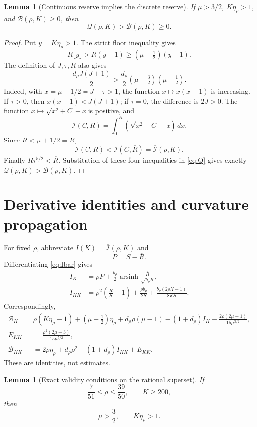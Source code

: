 \documentclass[11pt]{article}
\newtheorem{lemma}[theorem]{Lemma}
\newcommand{\Bcal}{\mathcal B}
\newcommand{\Qcal}{\mathcal Q}
\newcommand{\Ical}{\mathcal I}
\newcommand{\Ibar}{\overline{\mathcal I}}
\newcommand{\Rbar}{\overline R}
\begin{document}
\begin{lemma}[Continuous reserve implies the discrete reserve]
\label{lem:B-to-Q}
If \(\mu>3/2\), \(K\eta_\rho>1\), and
\(\Bcal(\rho,K)\geq0\), then
\[
 \Qcal(\rho,K)>\Bcal(\rho,K)\geq0.
\]
\end{lemma}

\begin{proof}
Put \(y=K\eta_\rho>1\).  The strict floor inequality gives
\[
 R\lfloor y\rfloor>R(y-1)
 \geq(\mu-\tfrac12)(y-1).
\]
The definition of \(J,\tau,R\) also gives
\[
 \frac{d_\rho J(J+1)}2
 >\frac{d_\rho}{2}
   (\mu-\tfrac32)(\mu-\tfrac12).
\]
Indeed, with \(x=\mu-1/2=J+\tau>1\), the function
\(x\mapsto x(x-1)\) is increasing.  If \(\tau>0\), then
\(x(x-1)<J(J+1)\); if \(\tau=0\), the difference is \(2J>0\).
The function \(x\mapsto\sqrt{x^2+C}-x\) is positive, and
\[
 \Ical(C,R)=\int_0^R(\sqrt{x^2+C}-x)\,dx.
\]
Since \(R<\mu+1/2=\Rbar\),
\[
 \Ical(C,R)<\Ical(C,\Rbar)=\Ibar(\rho,K).
\]
Finally \(R\tau^{5/2}<\Rbar\).  Substitution of these four inequalities
in \eqref{eq:Q} gives exactly
\(\Qcal(\rho,K)>\Bcal(\rho,K)\).
\end{proof}

\section{Derivative identities and curvature propagation}

For fixed \(\rho\), abbreviate \(I(K)=\Ibar(\rho,K)\) and
\[
 P=S-\Rbar.
\]
Differentiating \eqref{eq:Ibar} gives
\begin{align}
 I_K&=\rho P+\frac{b_\rho}{2}
       \operatorname{arsinh}\frac{\Rbar}{\sqrt{b_\rho K}},
 \label{eq:IK}\\
 I_{KK}
 &=\rho^2\left(\frac{\Rbar}{S}-1\right)
   +\frac{\rho b_\rho}{2S}
   +\frac{b_\rho(2\rho K-1)}{8KS}.
 \label{eq:IKK}
\end{align}
Correspondingly,
\begin{align}
 \Bcal_K={}&
 \rho(K\eta_\rho-1)+(\mu-\tfrac12)\eta_\rho
 +d_\rho\rho(\mu-1)
 -(1+d_\rho)I_K
 -\frac{2\rho(2\mu-1)}{15\mu^{3/2}},
 \label{eq:BK}\\
 E_{KK}&=\frac{\rho^2(2\mu-3)}{15\mu^{5/2}},
 \label{eq:EKK}\\
 \Bcal_{KK}&=
 2\rho\eta_\rho+d_\rho\rho^2
 -(1+d_\rho)I_{KK}+E_{KK}.
 \label{eq:BKK}
\end{align}
These are identities, not estimates.

\begin{lemma}[Exact validity conditions on the rational superset]
\label{lem:validity}
If
\[
 \frac7{51}\leq\rho\leq\frac{39}{50},
 \qquad K\geq200,
\]
then
\[
 \mu>\frac32,\qquad K\eta_\rho>1.
\]
\end{lemma}
\end{document}
